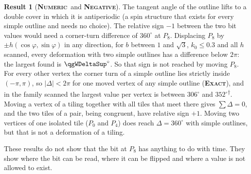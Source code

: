 \documentclass[11pt]{article}
\newcommand{\exact}{\textbf{\textsc{Exact}}}
\newcommand{\numeric}{\textbf{\textsc{Numeric}}}
\newcommand{\negres}{\textbf{\textsc{Negative}}}
\newcommand{\snap}{\textsuperscript{$\dagger$}}      %
\theoremstyle{definition}
\newtheorem{result}{Result}
\begin{document}
\begin{result}[\numeric\ and \negres]\label{res:flow-sign}
The tangent angle of the outline lifts to a double cover in which it is antiperiodic (a spin structure that exists for every simple outline and needs no choice). The relative sign $-1$ between the two bit values would need a corner-turn difference of $360^\circ$ at $P_8$. Displacing $P_8$ by $\pm h(\cos\varphi,\sin\varphi)$ in any direction, for $b$ between $1$ and $\sqrt3$, $k_0\le0.3$ and all $h$ scanned, every deformation with two simple outlines has a difference below $2\pi$: the largest found is $\qgWDeltaSup^\circ$. So that sign is not reached by moving $P_8$. For every other vertex the corner turn of a simple outline lies strictly inside $(-\pi,\pi)$, so $|\Delta|<2\pi$ for one moved vertex of any simple outline (\exact), and in the family scanned the largest value per vertex is between $306^\circ$ and $352^\circ$\snap. Moving a vertex of a tiling together with all tiles that meet there gives $\sum\Delta=0$, and the two tiles of a pair, being congruent, have relative sign $+1$. Moving two vertices of one isolated tile ($P_0$ and $P_4$) does reach $\Delta=360^\circ$ with simple outlines, but that is not a deformation of a tiling.
\end{result}
These results do not show that the bit at $P_8$ has anything to do with time. They show where the bit can be read, where it can be flipped and where a value is not allowed to exist.
\end{document}
